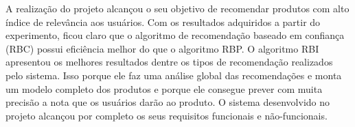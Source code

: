   A realização do projeto alcançou o seu objetivo de recomendar produtos com alto índice de relevância aos
 usuários. Com os resultados adquiridos a partir do experimento, ficou claro que o algoritmo de recomendação
 baseado em confiança (RBC) possui eficiência melhor do que o algoritmo RBP. O algoritmo RBI apresentou os
 melhores resultados dentre os tipos de recomendação realizados pelo sistema. Isso porque ele faz uma análise
 global das recomendações e monta um modelo completo dos produtos e porque ele consegue prever com muita
 precisão a nota que os usuários darão ao produto. O sistema desenvolvido no projeto alcançou por completo os
 seus requisitos funcionais e não-funcionais.


